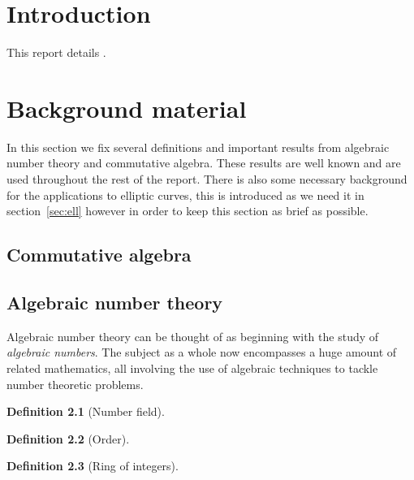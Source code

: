 \documentclass[11pt,a4paper]{report}
\theoremstyle{definition}
\newtheorem{defn}{Definition}
\begin{document}
\maketitle
\tableofcontents



\chapter{Introduction}

This report details .

\chapter{Background material}

In this section we fix several definitions and important results from algebraic number theory and commutative algebra.
These results are well known and are used throughout the rest of the report.
There is also some necessary background for the applications to elliptic curves, this is introduced as we need it in section~\ref{sec:ell} however in order to keep this section as brief as possible.

\section{Commutative algebra}


\section{Algebraic number theory}

Algebraic number theory can be thought of as beginning with the study of \emph{algebraic numbers}.
The subject as a whole now encompasses a huge amount of related mathematics, all involving the use of algebraic techniques to tackle number theoretic problems. %

\begin{defn}[Number field]
\end{defn}

\begin{defn}[Order]
\end{defn}

\begin{defn}[Ring of integers]
\end{defn}
\end{document}
